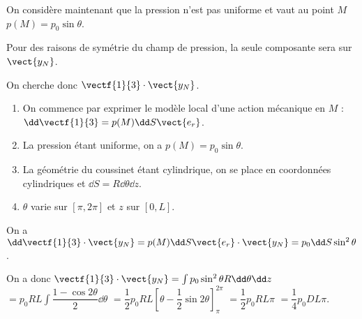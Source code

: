 \vspace{.5cm}

On considère maintenant que la pression n'est pas uniforme et vaut au point $M$ $p(M)=p_0\sin\theta$.
\ifprof
\begin{corrige}
Pour des raisons de symétrie du champ de pression, la seule composante sera sur $\vect{y_N}$.
\end{corrige}
\else
\fi


\ifprof
\begin{corrige}
On cherche donc $\vectf{1}{3} \cdot \vect{y_N}$.
\begin{enumerate}
\item On commence par exprimer le modèle local d'une action mécanique en $M$ : $\dd \vectf{1}{3} = p(M) \dd S \vect{e_r}$.
\item La pression étant uniforme, on a $p(M)=p_0 \sin\theta$.
\item La géométrie du coussinet étant cylindrique, on se place en coordonnées cylindriques et $\dd S = R\dd \theta \dd z$.  
\item $\theta$ varie sur $[\pi, 2\pi]$ et $z$ sur $[0,L]$. 
\end{enumerate}

On a  $\dd \vectf{1}{3} \cdot \vect{y_N} = p(M) \dd S \vect{e_r} \cdot \vect{y_N} =p_0 \dd S  \sin^2 \theta $. 

On a donc $\vectf{1}{3} \cdot \vect{y_N} = \int  p_0  \sin^2 \theta  R\dd \theta \dd z $
$ =   p_0 R L \int \dfrac{1-\cos 2\theta }{2}   \dd \theta$
$ =   \dfrac{1}{2}p_0 R L \left[\theta-\dfrac{1}{2}\sin 2\theta \right]^{2\pi}_{\pi} $
$ =   \dfrac{1}{2}p_0 R L {\pi} $
$ =   \dfrac{1}{4}p_0 D L {\pi} $.
\end{corrige}
\else
\fi



\ifcolle
\else
\ifprof
\else
{}
\fi
\fi

